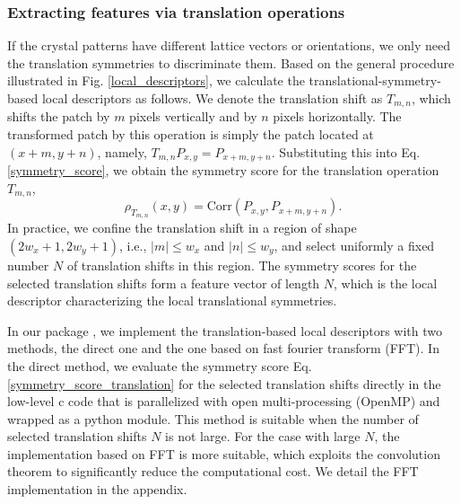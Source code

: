 \documentclass[twocolumn,amsmath, floatfix]{revtex4}
\begin{document}
\subsubsection{Extracting features via translation operations}
If the crystal patterns have different lattice vectors or orientations, we only need the translation symmetries to discriminate them.
Based on the general procedure illustrated in Fig. \ref{local_descriptors}, we calculate the translational-symmetry-based local descriptors as follows. We denote the translation shift as $T_{m,n}$, which shifts the patch by $m$ pixels vertically and by $n$ pixels horizontally.  The transformed patch by this operation is simply the patch located at $(x+m, y+n)$, namely, $T_{m,n}P_{x,y} = P_{x+m, y+n}$. 
Substituting this into Eq. \eqref{symmetry_score}, we obtain the symmetry score for the translation operation $T_{m,n}$,
\begin{equation}\label{symmetry_score_translation}
    \rho_{T_{m,n}} (x,y) = \mathrm{Corr}(P_{x,y}, P_{x+m, y+n}).
\end{equation}
In practice, we confine the translation shift in a region of shape $(2w_x+1,2w_y+1)$, i.e.,  $|m|\leq w_x$ and  $ |n|\leq w_y$, and select uniformly a fixed number $N$ of translation shifts in this region. The symmetry scores for the selected translation shifts form a feature vector of length $N$, which is the local descriptor characterizing the local translational symmetries.

In our package \cite{pystem, github}, we implement the translation-based local descriptors with two methods, the direct one and the one based on fast fourier transform (FFT). In the direct method, we evaluate the symmetry score Eq. \eqref{symmetry_score_translation} for the selected translation shifts directly in the low-level c code that is parallelized with open multi-processing (OpenMP) and wrapped as a python module. This method is suitable when the number of selected translation shifts $N$ is not large. For the case with large $N$,  the implementation based on FFT is more suitable, which exploits the convolution theorem to significantly reduce the computational cost. We detail the FFT implementation in the appendix.
\end{document}

